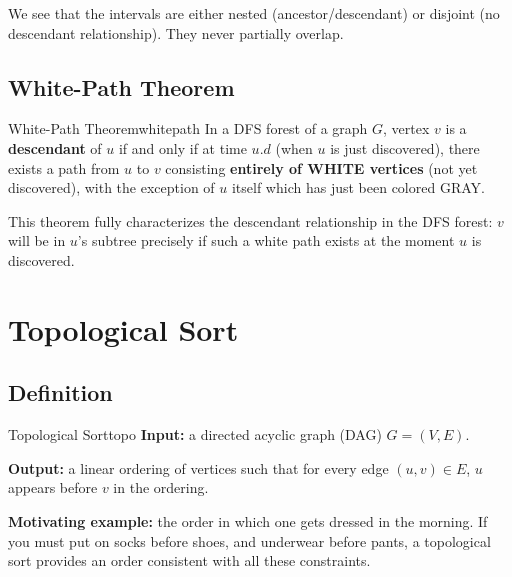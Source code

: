 We see that the intervals are either nested (ancestor/descendant) or disjoint
(no descendant relationship). They never partially overlap.

\subsection{White-Path Theorem}

\begin{theorem}{White-Path Theorem}{whitepath}
In a DFS forest of a graph $G$, vertex $v$ is a \textbf{descendant} of $u$
if and only if at time $u.d$ (when $u$ is just discovered), there exists a
path from $u$ to $v$ consisting \textbf{entirely of WHITE vertices}
(not yet discovered), with the exception of $u$ itself which has just been colored GRAY.
\end{theorem}

This theorem fully characterizes the descendant relationship in the DFS forest:
$v$ will be in $u$'s subtree precisely if such a white path exists
at the moment $u$ is discovered.

\section*{Topological Sort}

\subsection{Definition}

\begin{definition}{Topological Sort}{topo}
\textbf{Input:} a directed acyclic graph (DAG) $G = (V, E)$.

\textbf{Output:} a linear ordering of vertices such that for every edge
$(u, v) \in E$, $u$ appears before $v$ in the ordering.
\end{definition}

\textbf{Motivating example:} the order in which one gets dressed in the morning.
If you must put on socks before shoes, and underwear
before pants, a topological sort provides an order consistent with all these
constraints.

